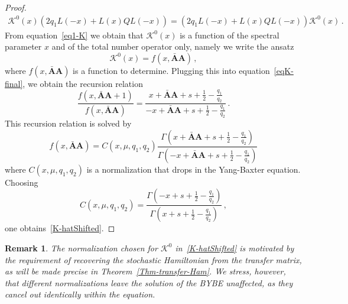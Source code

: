 \documentclass[11pt]{article}
\numberwithin{equation}{section}
\newtheorem{remark}[theorem]{Remark}
\newcommand{\OA}{\mathbf{A}}
\newcommand{\OAD}{\mathbf{\bar{A}}}
\newcommand{\Khat}{\mathcal{K}^{0}}
\begin{document}
\begin{proof}
\begin{equation}
    \begin{split}
   \Khat(x)\left(2q_{1}L(-x)+L(x)QL(-x)\right)=\left(2q_{1}L(-x)+L(x)QL(-x)\right)\Khat(x)\,.
    \end{split}
\end{equation}
From equation~\eqref{eq1-K} we obtain that $\Khat(x)$ is a function of the spectral parameter $x$ and of the total number operator only, namely we write the ansatz
\begin{equation}
    \Khat(x)=f(x,\OAD\OA)\,,
\end{equation}
where $f(x,\OAD\OA)$ is a function to determine. Plugging this into equation~\eqref{eqK-final}, we obtain the recursion relation
\begin{equation}
    \frac{f(x,\OAD\OA+1)}{f(x,\OAD\OA)}=\frac{x+\OAD\OA+s+\frac{1}{2}-\frac{q_{1}}{q_{2}}}{-x+\OAD\OA+s+\frac{1}{2}-\frac{q_{1}}{q_{2}}}\,.
\end{equation}
This recursion relation is solved by
    \begin{equation}
    f(x,\OAD\OA)=C(x,\mu,q_{1},q_{2})\frac{\Gamma\left(x+\OAD\OA+s+\frac{1}{2}-\frac{q_{1}}{q_{2}}\right)}{\Gamma\left(-x+\OAD\OA+s+\frac{1}{2}-\frac{q_{1}}{q_{2}}\right)}
\end{equation}
where $C(x,\mu,q_{1},q_{2})$ is a normalization that drops in the Yang-Baxter equation. Choosing
\begin{equation}
  C(x,\mu,q_{1},q_{2})=  \frac{\Gamma\left(-x+s+\frac{1}{2}-\frac{q_{1}}{q_{2}}\right)}{\Gamma\left(x+s+\frac{1}{2}-\frac{q_{1}}{q_{2}}\right)}\,,
\end{equation}
one obtains~\eqref{K-hatShifted}.
\end{proof}
\begin{remark}
The normalization chosen for $\Khat$ in~\eqref{K-hatShifted} is motivated by the requirement of recovering the stochastic Hamiltonian from the transfer matrix, as will be made precise in Theorem~\ref{Thm-transfer-Ham}. We stress, however, that different normalizations leave the solution of the BYBE unaffected, as they cancel out identically within the equation.
\end{remark}
\end{document}
